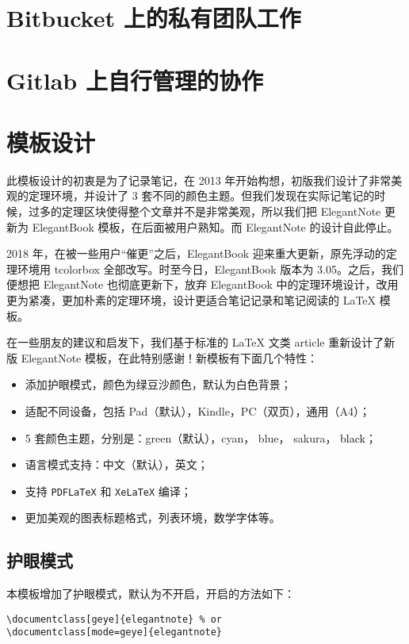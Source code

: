 \documentclass[cn,pad,11pt,green,geye]{../elegantnote}
\begin{document}
\section{Bitbucket 上的私有团队工作}

\section{Gitlab 上自行管理的协作}


\section{模板设计}
此模板设计的初衷是为了记录笔记，在 2013 年开始构想，初版我们设计了非常美观的定理环境，并设计了 3 套不同的颜色主题。但我们发现在实际记笔记的时候，过多的定理区块使得整个文章并不是非常美观，所以我们把 ElegantNote 更新为 ElegantBook 模板，在后面被用户熟知。而 ElegantNote 的设计自此停止。

2018 年，在被一些用户“催更”之后，ElegantBook 迎来重大更新，原先浮动的定理环境用 tcolorbox 全部改写。时至今日，ElegantBook 版本为 3.05。之后，我们便想把 ElegantNote 也彻底更新下，放弃 ElegantBook 中的定理环境设计，改用更为紧凑，更加朴素的定理环境，设计更适合笔记记录和笔记阅读的 \LaTeX{} 模板。

在一些朋友的建议和启发下，我们基于标准的 \LaTeX{} 文类 article 重新设计了新版 ElegantNote 模板，在此特别感谢！新模板有下面几个特性：
\begin{itemize}
\item 添加护眼模式，颜色为绿豆沙颜色，默认为白色背景；
\item 适配不同设备，包括 Pad（默认），Kindle，PC（双页），通用（A4）；
\item 5 套颜色主题，分别是：\textcolor{egreen}{green}（默认），\textcolor{ecyan}{cyan}， \textcolor{eblue}{blue}， \textcolor{sakura}{sakura}， \textcolor{black}{black}；
\item 语言模式支持：中文（默认），英文；
\item 支持 \lstinline{PDFLaTeX} 和 \lstinline{XeLaTeX} 编译；
\item 更加美观的图表标题格式，列表环境，数学字体等。
\end{itemize}

\subsection{护眼模式}
本模板增加了护眼模式，默认为不开启，开启的方法如下：
\begin{lstlisting}[frame=none]  
\documentclass[geye]{elegantnote} % or
\documentclass[mode=geye]{elegantnote}
\end{lstlisting}
\end{document}
